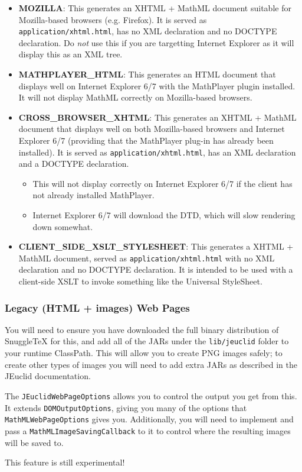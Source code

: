 \begin{itemize}
  \item \textbf{MOZILLA}: This generates an XHTML + MathML document suitable for
    Mozilla-based browsers (e.g. Firefox). It is served as \verb|application/xhtml.html|,
    has no XML declaration and no DOCTYPE declaration. Do \emph{not} use this if you
    are targetting Internet Explorer as it will display this as an XML tree.

  \item \textbf{MATHPLAYER\_HTML}: This generates an HTML document that displays well
    on Internet Explorer 6/7 with the MathPlayer plugin installed. It will not display
    MathML correctly on Mozilla-based browsers.

  \item \textbf{CROSS\_BROWSER\_XHTML}: This generates an XHTML + MathML document that
    displays well on both Mozilla-based browsers and Internet Explorer 6/7 (providing that
    the MathPlayer plug-in has already been installed). It is served as \verb|application/xhtml.html|,
    has an XML declaration and a DOCTYPE declaration.
    \begin{itemize}
      \item This will not display correctly on Internet Explorer 6/7 if the
        client has not already installed MathPlayer.
      \item Internet Explorer 6/7 will download the DTD, which will slow rendering down
        somewhat.
    \end{itemize}

  \item \textbf{CLIENT\_SIDE\_XSLT\_STYLESHEET}: This generates a XHTML + MathML document,
    served as \verb|application/xhtml.html| with no XML declaration and no DOCTYPE declaration.
    It is intended to be used with a client-side XSLT to invoke something like the
    Universal StyleSheet.

\end{itemize}

\subsubsection*{Legacy (HTML + images) Web Pages}

You will need to ensure you have downloaded the full binary distribution of
SnuggleTeX for this, and add all of the JARs under the \verb|lib/jeuclid| folder
to your runtime ClassPath. This will allow you to create PNG images safely; to
create other types of images you will need to add extra JARs as described in
the JEuclid documentation.

The \verb|JEuclidWebPageOptions| allows you to control the output you
get from this. It extends \verb|DOMOutputOptions|, giving you many of the
options that \verb|MathMLWebPageOptions| gives you. Additionally, you will
need to implement and pass a \verb|MathMLImageSavingCallback| to it to control where
the resulting images will be saved to.

This feature is still experimental!

